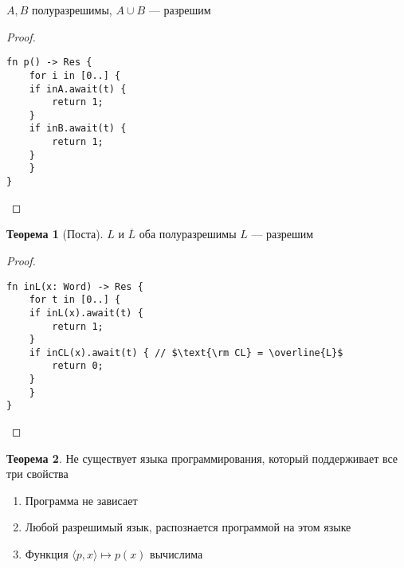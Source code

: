 \documentclass[english]{article}
\newcounter{propertycnt}
\theoremstyle{plain}
\newenvironment{property}{
  \renewcommand\thepropertyinner{\arabic{propertycnt}}
  \propertyinner
}{\endpropertyinner\stepcounter{propertycnt}}
\theoremstyle{remark}
\theoremstyle{definition}
\newtheorem{theorem}{Теорема}[section]
\begin{document}
\begin{property}
\(A, B\) полуразрешимы, \(A \cup B\) --- разрешим
\end{property}
\begin{proof}
\-
\begin{verbatim}
fn p() -> Res {
    for i in [0..] {
	if inA.await(t) {
	    return 1;
	}
	if inB.await(t) {
	    return 1;
	}
    }
}
\end{verbatim}
\end{proof}
\begin{theorem}[Поста]
\(L\) и \(\overline{L}\) оба полуразрешимы \implies \(L\) --- разрешим
\end{theorem}
\begin{proof}
\-
\begin{verbatim}
fn inL(x: Word) -> Res {
    for t in [0..] {
	if inL(x).await(t) {
	    return 1;
	}
	if inCL(x).await(t) { // $\text{\rm CL} = \overline{L}$
	    return 0;
	}
    }
}
\end{verbatim}
\end{proof}
\begin{theorem}
Не существует языка программирования, который поддерживает все три свойства
\begin{enumerate}
\item Программа не зависает
\item Любой разрешимый язык, распознается программой на этом языке
\item Функция \(\langle p, x \rangle \mapsto p(x)\) вычислима
\end{enumerate}
\end{theorem}
\end{document}
